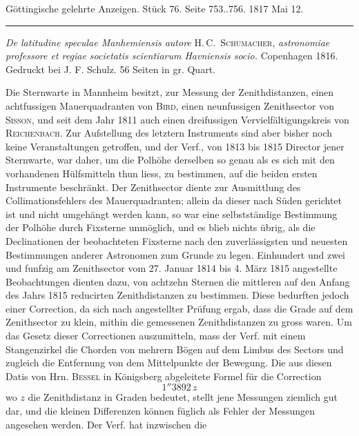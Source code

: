 \clearpage
{}
\hypertarget{native-602-lower}{}
\begin{center}\small Göttingische gelehrte Anzeigen. Stück 76. Seite 753..756. 1817 Mai 12.\\[3pt]\rule{.72\linewidth}{.3pt}\end{center}

\emph{De latitudine speculae Manhemiensis autore} H.\,C.\ \textsc{Schumacher},
\emph{astronomiae professore et regiae societatis scientiarum Havniensis
socio.} Copenhagen 1816. Gedruckt bei J. F. Schulz. 56 Seiten in gr. Quart.

Die Sternwarte in Mannheim besitzt, zur Messung der Zenithdistanzen, einen
achtfussigen Mauerquadranten von \textsc{Bird}, einen neunfussigen Zenithsector von \textsc{Sisson}, und seit dem Jahr 1811 auch einen
dreifussigen Vervielfältigungskreis von \textsc{Reichenbach}. Zur Aufstellung des letztern Instruments sind aber
bisher noch keine Veranstaltungen getroffen, und der Verf., von 1813 bis 1815 Director jener Sternwarte,
war daher, um die Polhöhe derselben so genau als es sich mit den vorhandenen Hülfsmitteln thun liess,
zu bestimmen, auf die beiden ersten Instrumente beschränkt. Der Zenithsector diente zur Ausmittlung
des Collimationsfehlers des Mauerquadranten; allein da dieser nach Süden gerichtet ist und nicht umgehängt werden kann, so war eine selbstständige Bestimmung der Polhöhe durch Fixsterne unmöglich,
und es blieb nichts übrig, als die Declinationen der beobachteten Fixsterne nach den zuverlässigsten
und neuesten Bestimmungen anderer Astronomen zum Grunde zu legen. Einhundert und zwei und funfzig am Zenithsector vom 27. Januar 1814 bis 4. März 1815 angestellte Beobachtungen dienten dazu, von
achtzehn Sternen die mittleren auf den Anfang des Jahrs 1815 reducirten Zenithdistanzen zu bestimmen.
Diese bedurften jedoch einer Correction, da sich nach angestellter Prüfung ergab, dass die Grade auf
dem Zenithsector zu klein, mithin die gemessenen Zenithdistanzen zu gross waren. Um das Gesetz dieser Correctionen auszumitteln, mass der Verf. mit einem Stangenzirkel die Chorden von mehrern Bögen auf dem Limbus des Sectors und zugleich die Entfernung von dem Mittelpunkte der Bewegung.
Die aus diesen Datis von Hrn. \textsc{Bessel} in Königsberg abgeleitete Formel für die Correction
\[
1''3892\,z
\]
wo $z$ die Zenithdistanz in Graden bedeutet, stellt jene Messungen ziemlich gut dar, und die kleinen
Differenzen können füglich als Fehler der Messungen angesehen werden. Der Verf. hat inzwischen die
